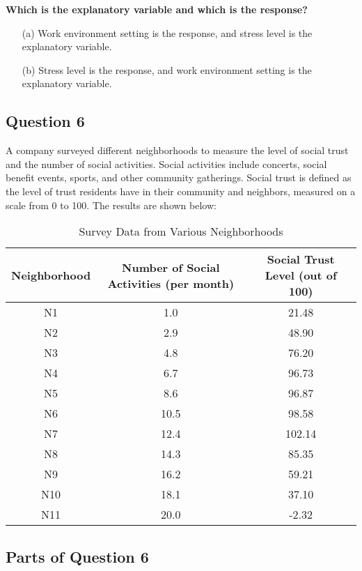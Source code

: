 \documentclass{article}
\begin{document}
\textbf{Which is the explanatory variable and which is the response?}
\begin{enumerate}
    \item[(a)] Work environment setting is the response, and stress level is the explanatory variable.
    \item[(b)] Stress level is the response, and work environment setting is the explanatory variable.
\end{enumerate}

\subsection*{Question 6}

A company surveyed different neighborhoods to measure the level of social trust and the number of social activities. Social activities include concerts, social benefit events, sports, and other community gatherings. Social trust is defined as the level of trust residents have in their community and neighbors, measured on a scale from 0 to 100. The results are shown below:

\begin{table}[h!]
\centering
\begin{tabular}{|c|c|c|}
\hline
Neighborhood & Number of Social Activities (per month) & Social Trust Level (out of 100) \\
\hline
N1 & 1.0 & 21.48 \\
N2 & 2.9 & 48.90 \\
N3 & 4.8 & 76.20 \\
N4 & 6.7 & 96.73 \\
N5 & 8.6 & 96.87 \\
N6 & 10.5 & 98.58 \\
N7 & 12.4 & 102.14 \\
N8 & 14.3 & 85.35 \\
N9 & 16.2 & 59.21 \\
N10 & 18.1 & 37.10 \\
N11 & 20.0 & -2.32 \\
\hline
\end{tabular}
\caption{Survey Data from Various Neighborhoods}
\end{table}

\subsection*{Parts of Question 6}
\end{document}
